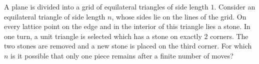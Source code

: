 A plane is divided into a grid of equilateral triangles of side length $1$.
Consider an equilateral triangle of side length $n$, whose sides lie on the lines of the grid.
On every lattice point on the edge and in the interior of this triangle lies a stone.
In one turn, a unit triangle is selected which has a stone on exactly $2$ corners.
The two stones are removed and a new stone is placed on the third corner.
For which $n$ is it possible that only one piece remains after a finite number of moves?
